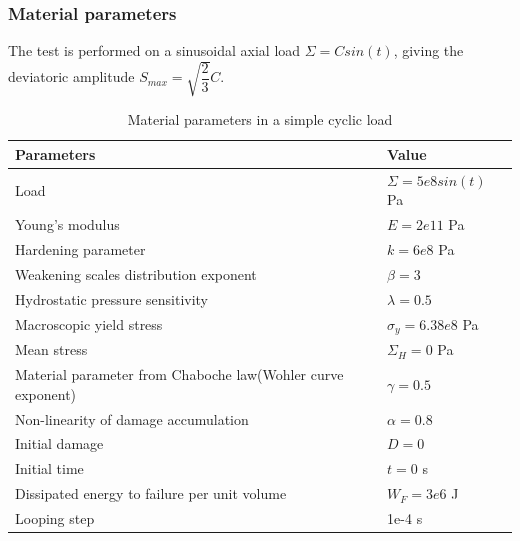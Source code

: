 \documentclass[xcolor=table]{Bredelebeamer}
\begin{document}
\begin{frame}
	\frametitle{Material parameters}
	The test is performed on a sinusoidal axial load $\Sigma=Csin(t)$, giving the deviatoric amplitude $S_{max}=\sqrt{\dfrac{2}{3}}C$.
\begin{table}[!h]
	\centering
	\begin{tabular}{ll}
		\hline
		\textbf{Parameters}                                         & \textbf{Value}                    \\ \hline
		Load                                                              & $\Sigma=5e8sin(t)$ Pa                  \\
		Young's modulus                                             & $E=2e11$ Pa                       \\
		Hardening parameter                                         &  $k=6e8$ Pa \\
		Weakening scales distribution exponent                      & $\beta=3$                             \\
		Hydrostatic pressure sensitivity                            & $\lambda=0.5$                     \\
		Macroscopic yield stress                                    & $\sigma_y=6.38e8$ Pa              \\
		Mean stress                                        & $\Sigma_H=0$ Pa                     \\
		Material parameter from Chaboche law(Wohler curve exponent) & $\gamma=0.5$                        \\
		Non-linearity of damage accumulation & $\alpha=0.8$                        \\
		Initial damage                                              & $D=0$                          \\
		Initial time                                                & $t=0$ s                            \\
		Dissipated energy to failure per unit volume                & $W_F=3e6$ J                       \\
		Looping step                                           & 1e-4 s              \\ \hline
	\end{tabular}
	\caption{Material parameters in a simple cyclic load }
	\label{Sin}
\end{table}
\end{frame}	
\end{document}
